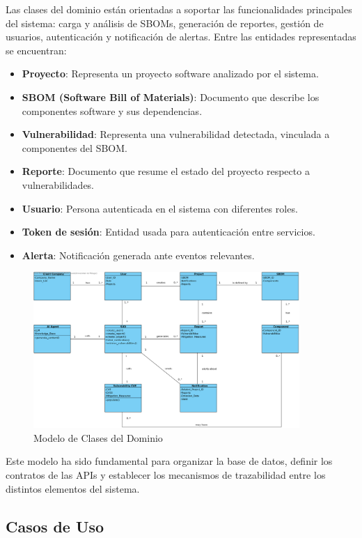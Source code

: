 \documentclass[11pt]{article}
\begin{document}
Las clases del dominio están orientadas a soportar las funcionalidades principales del sistema: carga y análisis de SBOMs, generación de reportes, gestión de usuarios, autenticación y notificación de alertas. Entre las entidades representadas se encuentran:

\begin{itemize}
    \item \textbf{Proyecto}: Representa un proyecto software analizado por el sistema.
    \item \textbf{SBOM (Software Bill of Materials)}: Documento que describe los componentes software y sus dependencias.
    \item \textbf{Vulnerabilidad}: Representa una vulnerabilidad detectada, vinculada a componentes del SBOM.
    \item \textbf{Reporte}: Documento que resume el estado del proyecto respecto a vulnerabilidades.
    \item \textbf{Usuario}: Persona autenticada en el sistema con diferentes roles.
    \item \textbf{Token de sesión}: Entidad usada para autenticación entre servicios.
    \item \textbf{Alerta}: Notificación generada ante eventos relevantes.
\end{itemize}

\begin{figure}[H]
    \centering
    \includegraphics[width=0.9\textwidth]{images/Domain_Classes.png}
    \caption{Modelo de Clases del Dominio}
\end{figure}

Este modelo ha sido fundamental para organizar la base de datos, definir los contratos de las APIs y establecer los mecanismos de trazabilidad entre los distintos elementos del sistema.

\subsection{Casos de Uso}
\end{document}
